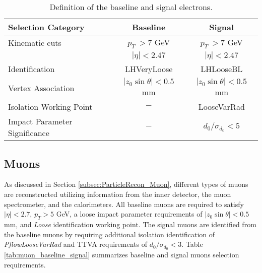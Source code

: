 \begin{table}[ht]
    \centering
        \caption{Definition of the baseline and signal electrons.\label{tab:Electron_RecoSel}}
        \begin{tabular}{|| l || c | c ||}
        \hline
        Selection Category & \textbf{Baseline} & \textbf{Signal} \\
        \hline\hline
        Kinematic cuts & $p_{T}~ > 7$ GeV & $ p_{T}~ > 7$ GeV \\
                    & $|\eta| < 2.47$  &  $|\eta| < 2.47$\\
        \hline  
        Identification & LHVeryLoose & LHLooseBL \\
        \hline 
        Vertex Association & $|z_{0}\sin\theta| < 0.5$ mm & $|z_{0}\sin\theta|< 0.5$ mm\\
        \hline
        Isolation Working Point & $-$ & LooseVarRad\\
        \hline 
        Impact Parameter Significance & $-$ & $d_{0}/ \sigma_{d_{0}} < 5$ \\
        \hline
    \end{tabular}
\end{table}

\subsection{Muons}
\label{subsec:MuonRecon}
As discussed in Section \ref{subsec:ParticleRecon_Muon}, different types of muons are reconstructed utilizing information from the inner detector, the muon spectrometer, and the calorimeters. All baseline muons are required to satisfy $ |\eta| < 2.7 $, $p_{T} > 5$ GeV, a loose impact parameter requirements of $|z_{0}\sin\theta| < 0.5 $ mm, and \textit{Loose} identification working point. The signal muons are identified from the baseline muons by requiring additional isolation identification of \textit{PflowLooseVarRad} and TTVA requirements of $d_{0}/\sigma_{d_{0}} < 3$. Table \ref{tab:muon_baseline_signal} summarizes baseline and signal muons selection requirements.

